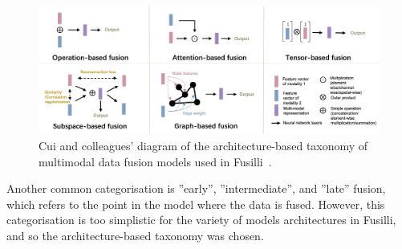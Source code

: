 
\begin{figure}
    \centering
    \includegraphics[width=\textwidth]{figures/cui_diagram}
    \caption{Cui and colleagues' diagram of the architecture-based taxonomy of multimodal data fusion models used in Fusilli~\cite{cuiDeepMultimodalFusion2022}.}
    \label{fig:fusilli_taxonomy}
\end{figure}


Another common categorisation is ''early'', ''intermediate'', and ''late'' fusion, which refers to the point in the model where the data is fused.
However, this categorisation is too simplistic for the variety of models architectures in Fusilli, and so the architecture-based taxonomy was chosen.

